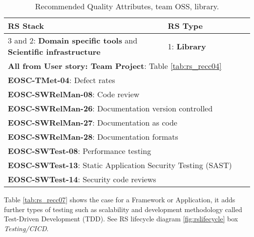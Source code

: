 \begin{center}
\begin{table}

  \small
  \begin{tabular}{|p{0.65\linewidth}|p{0.35\linewidth}|} \hline

    \textbf{RS Stack} & \textbf{RS Type} \\ \hline \hline
    3 and 2: \textbf{Domain specific tools} and  \textbf{Scientific infrastructure} &
    1: \textbf{Library} \\ \hline \hline
    \multicolumn{2}{|l|}{\textbf{All from User story: Team Project}: Table \ref{tab:rs_recc04}} \\ \hline
    \multicolumn{2}{|l|}{\textbf{EOSC-TMet-04}: Defect rates} \\ \hline
    \multicolumn{2}{|l|}{\textbf{EOSC-SWRelMan-08}: Code review} \\ \hline
    \multicolumn{2}{|l|}{\textbf{EOSC-SWRelMan-26}: Documentation version controlled} \\ \hline
    \multicolumn{2}{|l|}{\textbf{EOSC-SWRelMan-27}: Documentation as code} \\ \hline
    \multicolumn{2}{|l|}{\textbf{EOSC-SWRelMan-28}: Documentation formats} \\ \hline
    \multicolumn{2}{|l|}{\textbf{EOSC-SWTest-08}: Performance testing} \\ \hline
    \multicolumn{2}{|l|}{\textbf{EOSC-SWTest-13}: Static Application Security Testing (SAST)} \\ \hline
    \multicolumn{2}{|l|}{\textbf{EOSC-SWTest-14}: Security code reviews} \\ \hline

  \end{tabular}
  \caption{Recommended Quality Attributes, team OSS, library.}
  \label{tab:rs_recc06}
\end{table}
\end{center}

Table \ref{tab:rs_recc07} shows the case for a Framework or Application, it adds further types of testing such as scalability and development methodology called Test-Driven Development (TDD). See RS lifecycle diagram \ref{fig:rslifecycle} box \textit{Testing/CICD}.


